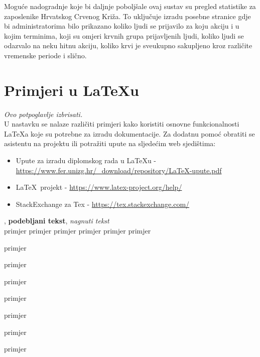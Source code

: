 		Moguće nadogradnje koje bi daljnje poboljšale ovaj sustav su pregled statistike za zaposlenike Hrvatskog Crvenog Križa. To uključuje izradu posebne stranice gdje bi administratorima bilo prikazano koliko ljudi se prijavilo za koju akciju i u kojim terminima, koji su omjeri krvnih grupa prijavljenih ljudi, koliko ljudi se odazvalo na neku hitnu akciju, koliko krvi je sveukupno sakupljeno kroz različite vremenske periode i slično.



		\eject
		
		\section{Primjeri u \LaTeX u}
		
		\textit{Ovo potpoglavlje izbrisati.}\\

		U nastavku se nalaze različiti primjeri kako koristiti osnovne funkcionalnosti \LaTeX a koje su potrebne za izradu dokumentacije. Za dodatnu pomoć obratiti se asistentu na projektu ili potražiti upute na sljedećim web sjedištima:
		\begin{itemize}
			\item Upute za izradu diplomskog rada u \LaTeX u - \url{https://www.fer.unizg.hr/_download/repository/LaTeX-upute.pdf}
			\item \LaTeX\ projekt - \url{https://www.latex-project.org/help/}
			\item StackExchange za Tex - \url{https://tex.stackexchange.com/}\\
		
		\end{itemize} 	


		
		\noindent {}, \textbf{podebljani tekst}, 	\textit{nagnuti tekst}\\
		\noindent \normalsize primjer \large primjer \Large primjer \LARGE {primjer} \huge {primjer} \Huge primjer \normalsize
				
		\begin{packed_item}
			
			\item  primjer
			\item  primjer
			\item  primjer
			\item[] \begin{packed_enum}
				\item primjer
				\item[] \begin{packed_enum}
					\item[1.a] primjer
					\item[b] primjer
				\end{packed_enum}
				\item primjer
			\end{packed_enum}
			
		\end{packed_item}
		
